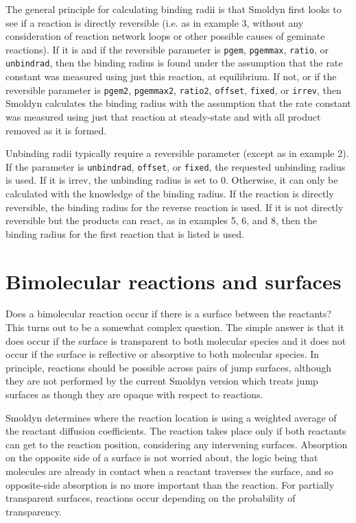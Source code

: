 \documentclass {scrbook}
\newcommand {\ttt} {\texttt}
\begin{document}
The general principle for calculating binding radii is that Smoldyn first looks to see if a reaction is directly reversible (i.e. as in example 3, without any consideration of reaction network loops or other possible causes of geminate reactions). If it is and if the reversible parameter is \ttt{pgem}, \ttt{pgemmax}, \ttt{ratio}, or \ttt{unbindrad}, then the binding radius is found under the assumption that the rate constant was measured using just this reaction, at equilibrium. If not, or if the reversible parameter is \ttt{pgem2}, \ttt{pgemmax2}, \ttt{ratio2}, \ttt{offset}, \ttt{fixed}, or \ttt{irrev}, then Smoldyn calculates the binding radius with the assumption that the rate constant was measured using just that reaction at steady-state and with all product removed as it is formed.

Unbinding radii typically require a reversible parameter (except as in example 2). If the parameter is \ttt{unbindrad}, \ttt{offset}, or \ttt{fixed}, the requested unbinding radius is used. If it is irrev, the unbinding radius is set to 0. Otherwise, it can only be calculated with the knowledge of the binding radius. If the reaction is directly reversible, the binding radius for the reverse reaction is used. If it is not directly reversible but the products can react, as in examples 5, 6, and 8, then the binding radius for the first reaction that is listed is used.

\section{Bimolecular reactions and surfaces}

Does a bimolecular reaction occur if there is a surface between the reactants? This turns out to be a somewhat complex question. The simple answer is that it does occur if the surface is transparent to both molecular species and it does not occur if the surface is reflective or absorptive to both molecular species. In principle, reactions should be possible across pairs of jump surfaces, although they are not performed by the current Smoldyn version which treats jump surfaces as though they are opaque with respect to reactions.

Smoldyn determines where the reaction location is using a weighted average of the reactant diffusion coefficients. The reaction takes place only if both reactants can get to the reaction position, considering any intervening surfaces. Absorption on the opposite side of a surface is not worried about, the logic being that molecules are already in contact when a reactant traverses the surface, and so opposite-side absorption is no more important than the reaction. For partially transparent surfaces, reactions occur depending on the probability of transparency.
\end{document}
